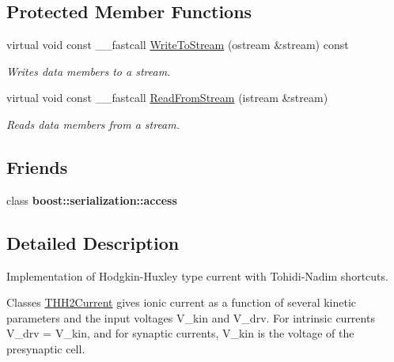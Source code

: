 \subsection*{Protected Member Functions}
\begin{DoxyCompactItemize}
\item 
\hypertarget{class_t_h_h2_current_ac3d319cf12cfa22b570ffa06accc9e88}{virtual void const \+\_\+\+\_\+fastcall \hyperlink{class_t_h_h2_current_ac3d319cf12cfa22b570ffa06accc9e88}{Write\+To\+Stream} (ostream \&stream) const }\label{class_t_h_h2_current_ac3d319cf12cfa22b570ffa06accc9e88}

\begin{DoxyCompactList}\small\item\em Writes data members to a stream. \end{DoxyCompactList}\item 
\hypertarget{class_t_h_h2_current_aab25d91572b98698ede17561073f1e39}{virtual void const \+\_\+\+\_\+fastcall \hyperlink{class_t_h_h2_current_aab25d91572b98698ede17561073f1e39}{Read\+From\+Stream} (istream \&stream)}\label{class_t_h_h2_current_aab25d91572b98698ede17561073f1e39}

\begin{DoxyCompactList}\small\item\em Reads data members from a stream. \end{DoxyCompactList}\end{DoxyCompactItemize}
\subsection*{Friends}
\begin{DoxyCompactItemize}
\item 
\hypertarget{class_t_h_h2_current_ac98d07dd8f7b70e16ccb9a01abf56b9c}{class {\bfseries boost\+::serialization\+::access}}\label{class_t_h_h2_current_ac98d07dd8f7b70e16ccb9a01abf56b9c}

\end{DoxyCompactItemize}


\subsection{Detailed Description}
Implementation of Hodgkin-\/\+Huxley type current with Tohidi-\/\+Nadim shortcuts. 


\begin{DoxyPre}
 Classes \hyperlink{class_t_h_h2_current}{THH2Current} gives ionic current as a function of several kinetic
 parameters and the input voltages V\_kin and V\_drv.  For intrinsic currents
 V\_drv = V\_kin, and for synaptic currents, V\_kin is the voltage of the
 presynaptic cell.\end{DoxyPre}



